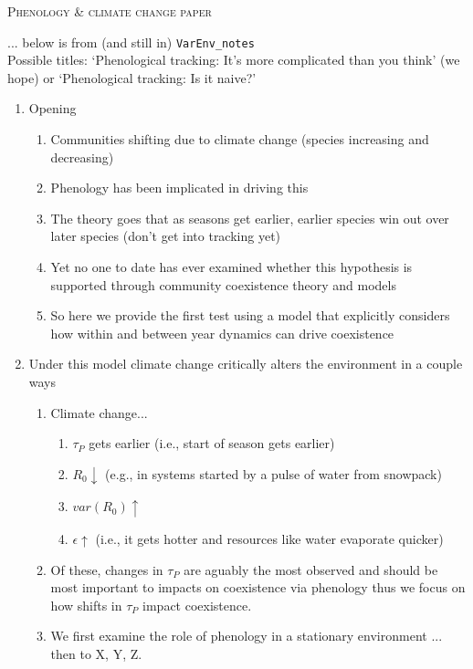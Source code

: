 \documentclass[11pt,letterpaper]{article}
\renewcommand{\section}[1]{%
\bigskip
\begin{center}
\begin{Large}
\normalfont\scshape #1
\medskip
\end{Large}
\end{center}}
\begin{document}
\section{Phenology \& climate change paper} ...  below is from (and still in) \verb|VarEnv_notes|\\
\noindent Possible titles: `Phenological tracking: It's more complicated than you think' (we hope) or `Phenological tracking: Is it naive?'
\begin{enumerate}
\item Opening
\begin{enumerate}
\item Communities shifting due to climate change (species increasing and decreasing)
\item Phenology has been implicated in driving this 
\item The theory goes that as seasons get earlier, earlier species win out over later species (don't get into tracking yet)
\item Yet no one to date has ever examined whether this hypothesis is supported through community coexistence theory and models
\item So here we provide the first test using a model that explicitly considers how within and between year dynamics can drive coexistence
\end{enumerate}
\item Under this model climate change critically alters the environment in a couple ways
\begin{enumerate}
\item Climate change...
\begin{enumerate}
\item $\tau_{P}$ gets earlier (i.e., start of season gets earlier)
\item $R_{0} \downarrow$ (e.g., in systems started by a pulse of water from snowpack)
\item $var(R_{0}) \uparrow$ 
\item $\epsilon \uparrow$ (i.e., it gets hotter and resources like water evaporate quicker)
\end{enumerate}
\item Of these, changes in $\tau_{P}$ are aguably the most observed and should be most important to impacts on coexistence via phenology thus we focus on how shifts in $\tau_{P}$ impact coexistence.
\item We first examine the role of phenology in a stationary environment ... then to X, Y, Z.
\end{enumerate}

\end{enumerate}
\end{document}
